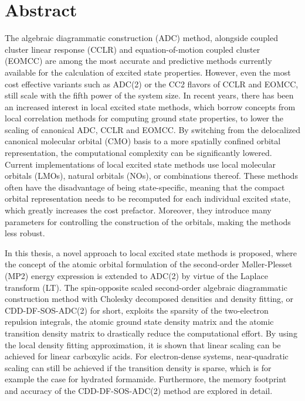 \chapter*{Abstract}

The algebraic diagrammatic construction (ADC) method, alongside coupled cluster linear response (CCLR) and equation-of-motion coupled cluster (EOMCC) are among the most accurate and predictive methods currently available for the calculation of excited state properties. However, even the most cost effective variants such as ADC(2) or the CC2 flavors of CCLR and EOMCC, still scale with the fifth power of the system size. In recent years, there has been an increased interest in local excited state methods, which borrow concepts from local correlation methods for computing ground state properties, to lower the scaling of canonical ADC, CCLR and EOMCC. By switching from the delocalized canonical molecular orbital (CMO) basis to a more spatially confined orbital representation, the computational complexity can be significantly lowered. Current implementations of local excited state methods use local molecular orbitals (LMOs), natural orbitals (NOs), or combinations thereof. These methods often have the disadvantage of being state-specific, meaning that the compact orbital representation needs to be recomputed for each individual excited state, which greatly increases the cost prefactor. Moreover, they introduce many parameters for controlling the construction of the orbitals, making the methods less robust.

In this thesis, a novel approach to local excited state methods is proposed, where the concept of the atomic orbital formulation of the second-order M{\o}ller-Plesset (MP2) energy expression is extended to ADC(2) by virtue of the Laplace transform (LT). The spin-opposite scaled second-order algebraic diagrammatic construction method with Cholesky decomposed densities and density fitting, or CDD-DF-SOS-ADC(2) for short, exploits the sparsity of the two-electron repulsion integrals, the atomic ground state density matrix and the atomic transition density matrix to drastically reduce the computational effort. By using the local density fitting approximation, it is shown that linear scaling can be achieved for linear carboxylic acids. For electron-dense systems, near-quadratic scaling can still be achieved if the transition density is sparse, which is for example the case for hydrated formamide. Furthermore, the memory footprint and accuracy of the CDD-DF-SOS-ADC(2) method are explored in detail.

